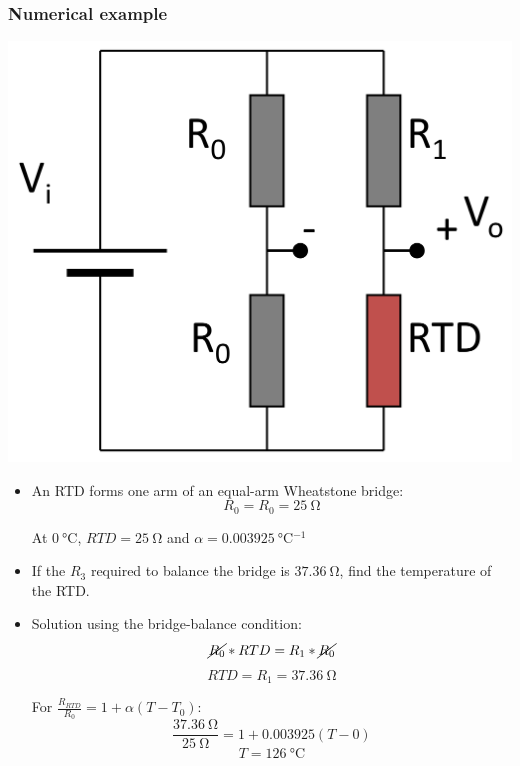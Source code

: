 \documentclass[11pt]{article}
\begin{document}
\subsubsection{Numerical example}
\label{sec:org91bab2f}
\begin{center}
\includegraphics[width=.9\linewidth]{./images/rtd-and-wheatstone-bridge-example.png}
\end{center}
\begin{itemize}
\item An RTD forms one arm of an equal-arm Wheatstone bridge:
\[R_0 = R_0 = \qty{25}{\ohm}\]

At \(\qty{0}{\degreeCelsius}\), \(RTD = \qty{25}{\ohm}\) and \(\alpha = \qty{0.003925}{\degreeCelsius^{-1}}\)
\item If the \(R_3\) required to balance the bridge is \(\qty{37.36}{\ohm}\), find the temperature of the RTD.
\item Solution using the bridge-balance condition:
\[\cancel{R_0} * RTD = R_1 * \cancel{R_0}\]
\[RTD = R_1 = \qty{37.36}{\ohm}\]

For \(\frac{R_{RTD}}{R_0} = 1 + \alpha (T - T_0)\):
\[\frac{\qty{37.36}{\ohm}}{\qty{25}{\ohm}} = 1 + 0.003925 (T - 0)\]
\[T = \qty{126}{\degreeCelsius}\]
\end{itemize}
\end{document}
